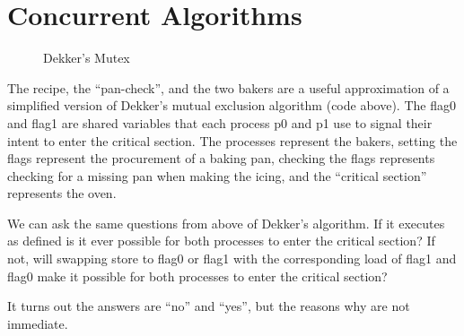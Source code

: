 \documentclass[9pt,twocolumn]{extarticle}
\newcommand{\ttf}[1]{{\ttfamily #1}}
\begin{document}
\vspace{-0.25cm}
\section{Concurrent Algorithms}
\vspace{-0.25cm}

\begin{figure}[h]
  \vspace{-0.6cm}
  \begin{minipage}{.24\textwidth}
        
  \end{minipage}
  \begin{minipage}{.25\textwidth}
        
      \end{minipage}
  \vspace{-0.25cm}
  \caption{Dekker's Mutex}
  \vspace{-0.25cm}
\end{figure}

The recipe, the ``pan-check'', and the two bakers are a useful approximation of a simplified version of Dekker's mutual exclusion algorithm (code above). The \ttf{flag0} and \ttf{flag1} are shared variables that each process \ttf{p0} and \ttf{p1} use to signal their intent to enter the critical section. The processes represent the bakers, setting the flags represent the procurement of a baking pan, checking the flags represents checking for a missing pan when making the icing, and the ``critical section'' represents the oven.

We can ask the same questions from above of Dekker's algorithm. If it executes as defined is it ever possible for both processes to enter the critical section? If not, will swapping store to \ttf{flag0} or \ttf{flag1} with the corresponding load of \ttf{flag1} and \ttf{flag0} make it possible for both processes to enter the critical section?

It turns out the answers are ``no'' and ``yes'', but the reasons why are not immediate.

\vspace{-0.25cm}
\end{document}
